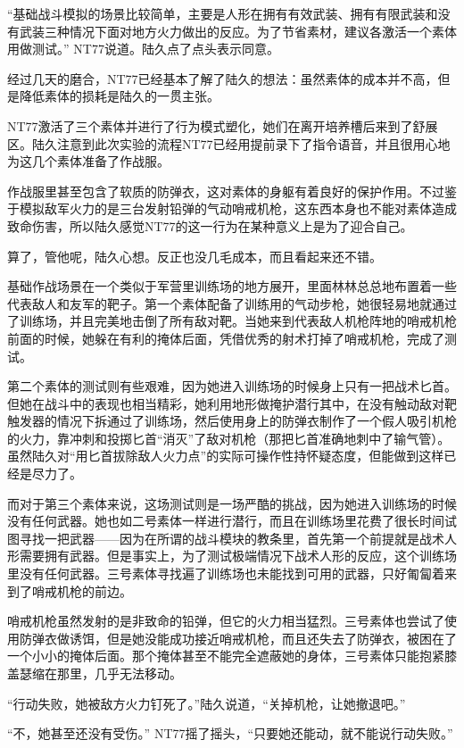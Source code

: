 “基础战斗模拟的场景比较简单，主要是人形在拥有有效武装、拥有有限武装和没有武装三种情况下面对地方火力做出的反应。为了节省素材，建议各激活一个素体用做测试。” NT77说道。陆久点了点头表示同意。

经过几天的磨合，NT77已经基本了解了陆久的想法：虽然素体的成本并不高，但是降低素体的损耗是陆久的一贯主张。

NT77激活了三个素体并进行了行为模式塑化，她们在离开培养槽后来到了舒展区。陆久注意到此次实验的流程NT77已经用提前录下了指令语音，并且很用心地为这几个素体准备了作战服。

作战服里甚至包含了软质的防弹衣，这对素体的身躯有着良好的保护作用。不过鉴于模拟敌军火力的是三台发射铅弹的气动哨戒机枪，这东西本身也不能对素体造成致命伤害，所以陆久感觉NT77的这一行为在某种意义上是为了迎合自己。

算了，管他呢，陆久心想。反正也没几毛成本，而且看起来还不错。

基础作战场景在一个类似于军营里训练场的地方展开，里面林林总总地布置着一些代表敌人和友军的靶子。第一个素体配备了训练用的气动步枪，她很轻易地就通过了训练场，并且完美地击倒了所有敌对靶。当她来到代表敌人机枪阵地的哨戒机枪前面的时候，她躲在有利的掩体后面，凭借优秀的射术打掉了哨戒机枪，完成了测试。

第二个素体的测试则有些艰难，因为她进入训练场的时候身上只有一把战术匕首。但她在战斗中的表现也相当精彩，她利用地形做掩护潜行其中，在没有触动敌对靶触发器的情况下拆通过了训练场，然后使用身上的防弹衣制作了一个假人吸引机枪的火力，靠冲刺和投掷匕首“消灭”了敌对机枪（那把匕首准确地刺中了输气管）。虽然陆久对“用匕首拔除敌人火力点”的实际可操作性持怀疑态度，但能做到这样已经是尽力了。

而对于第三个素体来说，这场测试则是一场严酷的挑战，因为她进入训练场的时候没有任何武器。她也如二号素体一样进行潜行，而且在训练场里花费了很长时间试图寻找一把武器——因为在所谓的战斗模块的教条里，首先第一个前提就是战术人形需要拥有武器。但是事实上，为了测试极端情况下战术人形的反应，这个训练场里没有任何武器。三号素体寻找遍了训练场也未能找到可用的武器，只好匍匐着来到了哨戒机枪的前边。

哨戒机枪虽然发射的是非致命的铅弹，但它的火力相当猛烈。三号素体也尝试了使用防弹衣做诱饵，但是她没能成功接近哨戒机枪，而且还失去了防弹衣，被困在了一个小小的掩体后面。那个掩体甚至不能完全遮蔽她的身体，三号素体只能抱紧膝盖瑟缩在那里，几乎无法移动。

“行动失败，她被敌方火力钉死了。”陆久说道，“关掉机枪，让她撤退吧。”

“不，她甚至还没有受伤。” NT77摇了摇头，“只要她还能动，就不能说行动失败。”

